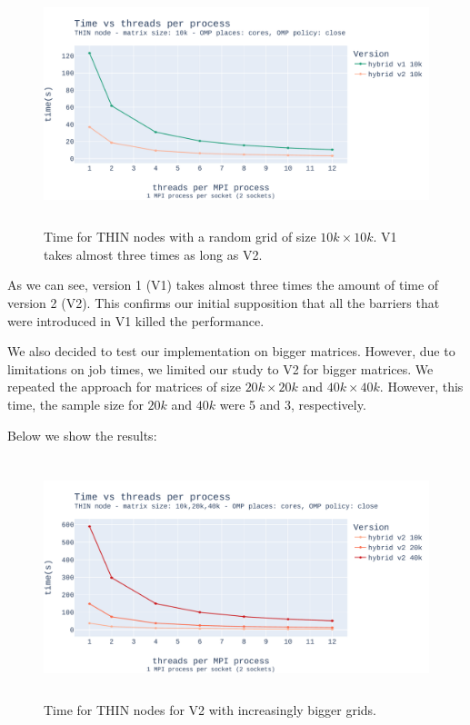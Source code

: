 \documentclass{report}
\begin{document}
\begin{figure}[H]
\centering
\includegraphics[width=14cm, height=7cm]{./images/strong_OMP_thin_hybrid_grid_010k.pdf}
\caption{\label{fig:strongomp10kspeedupthin} Time for THIN nodes with a 
random grid of size $10k \times 10k$. V1 takes almost three times as long as V2.}
\end{figure}

As we can see, version 1 (V1) takes almost three times the amount of time of 
version 2 (V2). This confirms our initial supposition that all the barriers 
that were introduced in V1 killed the performance. 

We also decided to test our implementation on bigger matrices. However, due to 
limitations on job times, we limited our study to V2 for bigger matrices. 
We repeated the approach for matrices of size $20k\times 20k$ and $40k\times 40k$. 
However, this time, the sample size for $20k$ and $40k$ were 5 and 3, respectively.

Below we show the results: 

\begin{figure}[H]
\centering
\includegraphics[width=14cm, height=7cm]{./images/strong_OMP_thin_hybrid_v2.pdf}
\caption{\label{fig:strongompv2thin} Time for THIN nodes for V2 with increasingly
bigger grids.}
\end{figure}
\end{document}
